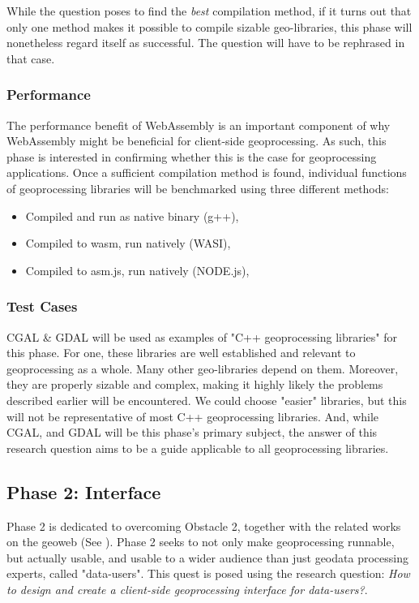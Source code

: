 While the question poses to find the \textit{best} compilation method, if it turns out that only one method makes it possible to compile sizable geo-libraries, this phase will nonetheless regard itself as successful. The question will have to be rephrased in that case. 

\subsubsection*{Performance}
The performance benefit of WebAssembly is an important component of why WebAssembly might be beneficial for client-side geoprocessing. As such, this phase is interested in confirming whether this is the case for geoprocessing applications. Once a sufficient compilation method is found, individual functions of geoprocessing libraries will be benchmarked using three different methods: 

\begin{itemize}
    \item Compiled and run as native binary (g++), 
    \item Compiled to wasm, run natively (WASI),
    \item Compiled to asm.js, run natively (NODE.js),
\end{itemize}

\subsubsection*{Test Cases}
CGAL \& GDAL will be used as examples of "C++ geoprocessing libraries" for this phase. For one, these libraries are well established and relevant to geoprocessing as a whole. Many other geo-libraries depend on them. Moreover, they are properly sizable and complex, making it highly likely the problems described earlier will be encountered. We could choose "easier" libraries, but this will not be representative of most C++ geoprocessing libraries. And, while CGAL, and GDAL will be this phase's primary subject, the answer of this research question aims to be a guide applicable to all geoprocessing libraries. 

\newpage
\subsection{Phase 2: Interface}

Phase 2 is dedicated to overcoming Obstacle 2, together with the related works on the geoweb (See ). Phase 2 seeks to not only make geoprocessing runnable, but actually usable, and usable to a wider audience than just geodata processing experts, called "data-users". This quest is posed using the research question: \textit{How to design and create a client-side geoprocessing interface for data-users?}. 

